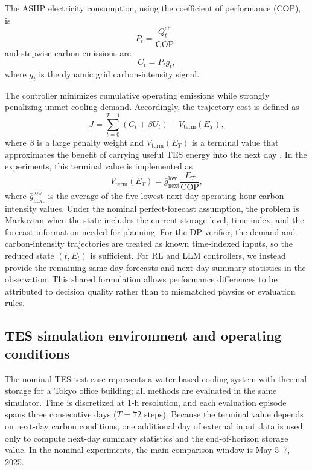 \documentclass[11pt]{article}
\begin{document}
The ASHP electricity consumption, using the coefficient of performance (COP), is
\begin{equation}
P_t=\frac{Q_t^{\mathrm{ch}}}{\mathrm{COP}},
\end{equation}
and stepwise carbon emissions are
\begin{equation}
C_t=P_t g_t,
\end{equation}
where $g_t$ is the dynamic grid carbon-intensity signal.

The controller minimizes cumulative operating emissions while strongly penalizing unmet cooling demand. Accordingly, the trajectory cost is defined as
\begin{equation}
J=\sum_{t=0}^{T-1}\left(C_t+\beta U_t\right)-V_{\mathrm{term}}(E_T),
\end{equation}
where $\beta$ is a large penalty weight and $V_{\mathrm{term}}(E_T)$ is a terminal value that approximates the benefit of carrying useful TES energy into the next day \cite{bertsekas_dpoc_vols_2012_2017}. In the experiments, this terminal value is implemented as
\begin{equation}
V_{\mathrm{term}}(E_T)=\bar g^{\mathrm{low}}_{\mathrm{next}}\frac{E_T}{\mathrm{COP}},
\end{equation}
where $\bar g^{\mathrm{low}}_{\mathrm{next}}$ is the average of the five lowest next-day operating-hour carbon-intensity values. Under the nominal perfect-forecast assumption, the problem is Markovian when the state includes the current storage level, time index, and the forecast information needed for planning. For the DP verifier, the demand and carbon-intensity trajectories are treated as known time-indexed inputs, so the reduced state $(t,E_t)$ is sufficient. For RL and LLM controllers, we instead provide the remaining same-day forecasts and next-day summary statistics in the observation. This shared formulation allows performance differences to be attributed to decision quality rather than to mismatched physics or evaluation rules.

\subsection{TES simulation environment and operating conditions}\label{subsec:tes-setup}
The nominal TES test case represents a water-based cooling system with thermal storage for a Tokyo office building; all methods are evaluated in the same simulator. Time is discretized at 1-h resolution, and each evaluation episode spans three consecutive days ($T=72$ steps). Because the terminal value depends on next-day carbon conditions, one additional day of external input data is used only to compute next-day summary statistics and the end-of-horizon storage value. In the nominal experiments, the main comparison window is May 5--7, 2025.
\end{document}
